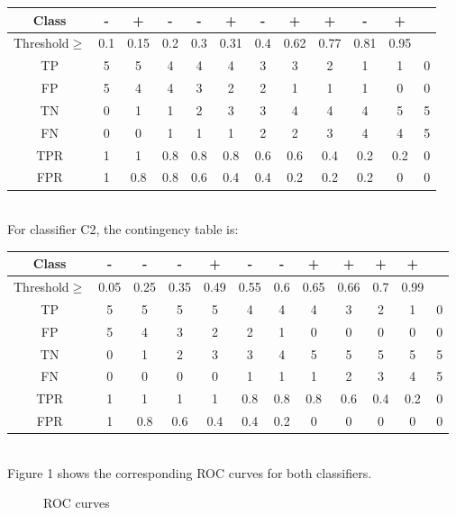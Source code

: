 \documentclass[22pt]{article}
\begin{document}
	\begin{tabular}{|c|c|c|c|c|c|c|c|c|c|c|c|}
	\hline
	Class & - & + & - & - & + & - & + & + & - & +& \\ \hline
	Threshold$\geq$& 0.1 & 0.15 & 0.2 & 0.3 & 0.31 & 0.4 & 0.62 & 0.77 & 0.81 & 0.95 &\\ \hline
	TP & 5 & 5 & 4 & 4 & 4 & 3 & 3 & 2 & 1 & 1 & 0 \\ \hline
	FP & 5 & 4 & 4 & 3 & 2 & 2 & 1 & 1 & 1 & 0 &0\\ \hline
	TN & 0 & 1 & 1 & 2 & 3 & 3 & 4 & 4 & 4 & 5 &5\\ \hline
	FN & 0 & 0 & 1 & 1 & 1 & 2 & 2 & 3 & 4 & 4 &5\\ \hline
	TPR& 1 &1 &0.8 &0.8 &0.8 &0.6 &0.6 &0.4 &0.2 &0.2 &0 \\ \hline 
	FPR&1&0.8 &0.8 &0.6 &0.4 &0.4 &0.2 &0.2 &0.2 &0 &0 \\ \hline
	\end{tabular}\\[1ex]

	For classifier C2, the contingency table is: \\
	
	\begin{tabular}{|c|c|c|c|c|c|c|c|c|c|c|c|}
	\hline
	Class & - & - & - & + & - & - & + & + & + & +& \\ \hline
	Threshold$\geq$& 0.05 & 0.25 & 0.35 & 0.49 & 0.55 & 0.6 & 0.65 & 0.66 & 0.7 & 0.99 &\\ \hline
	TP & 5 &5 &5 &5 &4 &4 & 4& 3& 2& 1&0 \\ \hline
	FP & 5 &4 &3 &2 &2 &1 & 0& 0& 0& 0&0 \\ \hline
	TN & 0 &1 &2 &3 &3 &4 & 5& 5& 5& 5&5 \\ \hline
	FN & 0 &0 &0 &0 &1 &1 & 1& 2& 3& 4&5 \\ \hline
	TPR& 1 &1 &1 &1 &0.8 &0.8 &0.8 &0.6 &0.4 &0.2 &0 \\ \hline
	FPR& 1&0.8 &0.6 &0.4 &0.4 &0.2 &0 &0 &0 &0 &0 \\ \hline
	\end{tabular}\\[1ex]

	Figure 1 shows the corresponding ROC curves for both classifiers.
	\begin{figure}[H]
				\centering
				\caption{ROC curves} 
			\end{figure}
\end{document}
